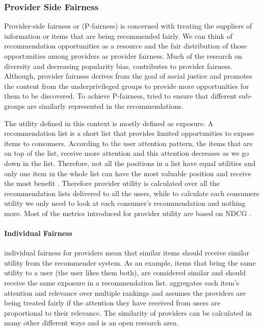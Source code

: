 \subsubsection{Provider Side Fairness}        
Provider-side fairness or (P-fairness) is concerned with treating the suppliers of information or items that are being recommended fairly. We can think of recommendation opportunities as a resource and the fair distribution of those opportunities among providers as provider fairness. 
Much of the research on diversity and decreasing popularity bias, contributes to provider fairness. Although, provider fairness derives from the goal of social justice and promotes the content from the underprivileged groups to provide more opportunities for them to be discovered. 
To achieve P-fairness, \cite{mehtora2018towards} tried to ensure that different sub-groups are similarly represented in the recommendations.
    
The utility defined in this context is mostly defined as exposure. A recommendation list is a short list that provides limited opportunities to expose items to consumers. According to the user attention pattern, the items that are on top of the list, receive more attention and this attention decreases as we go down in the list. Therefore, not all the positions in a list have equal utilities and only one item in the whole list can have the most valuable position and receive the most benefit \cite{diaz2020}. Therefore provider utility is calculated over all the recommendation lists delivered to all the users, while to calculate each consumers utility we only need to look at each consumer's recommendation and nothing more. Most of the metrics introduced for provider utility are based on NDCG \cite{biega2018equity}. %

\paragraph{Individual Fairness}
individual fairness for providers mean that similar items should receive similar utility from the recommender system. As an example, items that bring the same utility to a user (the user likes them both), are considered similar and should receive the same exposure in a recommendation list. \cite{biega2018equity} aggregates each item's attention and relevance over multiple rankings and assumes the providers are being treated fairly if the attention they have received from users are proportional to their relevance. The similarity of providers can be calculated in many other different ways and is an open research area.
    
